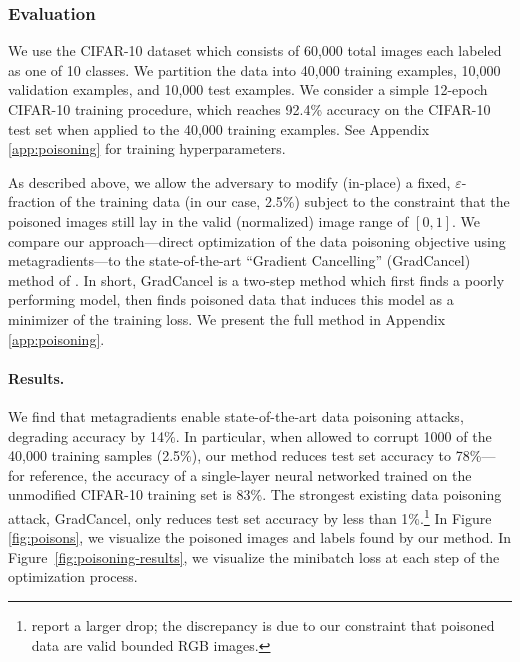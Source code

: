 \subsubsection{Evaluation}
We use the CIFAR-10 dataset
which consists of 60,000 total images each labeled as one of 10 classes.
We partition the data into 40,000 training examples, 10,000 validation examples,
and 10,000 test examples.
We consider a simple 12-epoch CIFAR-10 training procedure,
which reaches 92.4\% accuracy on the CIFAR-10 test set when applied to the
40,000 training examples. See Appendix
\ref{app:poisoning} for training hyperparameters.

As described above,
we allow the adversary to modify (in-place) a fixed, $\varepsilon$-fraction of
the training data (in our case, 2.5\%)
subject to the constraint that the poisoned images
still lay in the valid (normalized) image range of $[0, 1]$.
We compare our approach---direct optimization of the data poisoning
objective using metagradients---to the state-of-the-art ``Gradient Cancelling''
(GradCancel) method of \citet{lu2023exploring}. In short, GradCancel
is a two-step method which
first finds a poorly performing model,
then finds poisoned data that induces this model as a minimizer of
the training loss.
We present the full method in Appendix \ref{app:poisoning}.

\paragraph{Results.} We find that metagradients enable state-of-the-art
data poisoning attacks, degrading accuracy by 14\%.
In particular, when allowed to corrupt 1000 of the 40,000 training
samples (2.5\%), our method reduces test set accuracy to 78\%---for reference,
the accuracy of a single-layer neural networked trained on the unmodified
CIFAR-10 training set is 83\%.
The strongest existing data poisoning attack,
GradCancel, only reduces test set accuracy by less than 1\%.\footnote{
  \citet{lu2023exploring} report a larger drop; the discrepancy
  is due to our constraint that poisoned data are valid bounded RGB images.
}
In Figure \ref{fig:poisons}, we visualize the
poisoned images and labels found by our method.
In Figure~\ref{fig:poisoning-results},
we visualize the minibatch loss at each step of the
optimization process.

